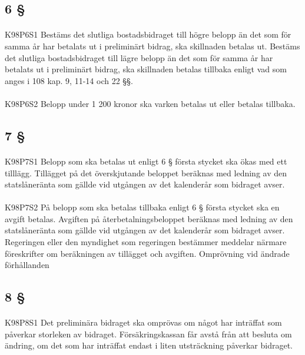 \documentclass[a4paper,notitlepage,openany,10pt]{book}
\begin{document}
\subsection*{6 §}
\paragraph*{}
{\tiny K98P6S1}
Bestäms det slutliga bostadsbidraget till högre belopp än det som för samma år har betalats ut i preliminärt bidrag, ska skillnaden betalas ut. Bestäms det slutliga bostadsbidraget till lägre belopp än det som för samma år har betalats ut i preliminärt bidrag, ska skillnaden betalas tillbaka enligt vad som anges i 108 kap. 9, 11-14 och 22 §§.
\paragraph*{}
{\tiny K98P6S2}
Belopp under 1 200 kronor ska varken betalas ut eller betalas tillbaka.
\subsection*{7 §}
\paragraph*{}
{\tiny K98P7S1}
Belopp som ska betalas ut enligt 6 § första stycket ska ökas med ett tilllägg. Tillägget på det överskjutande beloppet beräknas med ledning av den statslåneränta som gällde vid utgången av det kalenderår som bidraget avser.
\paragraph*{}
{\tiny K98P7S2}
På belopp som ska betalas tillbaka enligt 6 § första stycket ska en avgift betalas. Avgiften på återbetalningsbeloppet beräknas med ledning av den statslåneränta som gällde vid utgången av det kalenderår som bidraget avser.
Regeringen eller den myndighet som regeringen bestämmer meddelar närmare föreskrifter om beräkningen av tillägget och avgiften.
Omprövning vid ändrade förhållanden
\subsection*{8 §}
\paragraph*{}
{\tiny K98P8S1}
Det preliminära bidraget ska omprövas om något har inträffat som påverkar storleken av bidraget.
Försäkringskassan får avstå från att besluta om ändring, om det som har inträffat endast i liten utsträckning påverkar bidraget.
\end{document}
